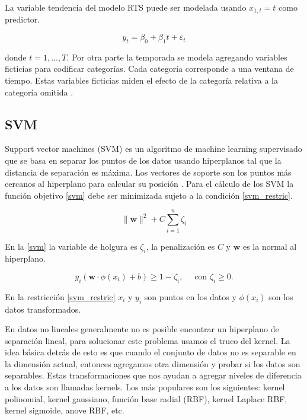 La variable tendencia del modelo RTS puede ser modelada usando $x_{1, t}=t$ como predictor.

\[
y_{t}=\beta_{0}+\beta_{1} t+\varepsilon_{t}
\]

donde $t=1,...,T$. Por otra parte la temporada se modela agregando variables ficticias para codificar categorías. Cada categoría corresponde a una ventana de tiempo. Estas variables ficticias miden el efecto de la categoría relativa a la categoría omitida \cite{hyndmanForecastingPrinciplesPractice}. 

\subsection{SVM}

Support vector machines (SVM) es un algoritmo de machine learning supervisado que se basa en separar los puntos de los datos usando hiperplanos tal que la distancia de separación es máxima. Los vectores de soporte son los puntos más cercanos al hiperplano para calcular su posición \cite{mudassirTimeseriesForecastingBitcoin2020}.
Para el cálculo de los SVM la función objetivo \ref{svm} debe ser minimizada sujeto a la condición \ref{svm_restric}.

\begin{equation}
	\|\mathbf{w}\|^{2}+C \sum_{i=1}^{n} \zeta_{i}
	\label{svm}
\end{equation}

En la \autoref{svm} la variable de holgura es $\zeta_{i}$, la penalización es $C$ y $\mathbf{w}$ es la normal al hiperplano.

\begin{equation}
	y_{i}\left(\mathbf{w} \cdot \phi\left(x_{i}\right)+b \right) \geq 1-\zeta_{i}, \quad \text { con } \zeta_{i} \geq 0.
	\label{svm_restric}
\end{equation}

En la restricción \ref{svm_restric} $x_i$ y $y_i$ son puntos en los datos y $\phi(x_i)$ son los datos transformados. 

En datos no lineales generalmente no es posible encontrar un hiperplano de separación lineal, para solucionar este problema usamos el truco del kernel. La idea básica detrás de esto es que cuando el conjunto de datos no es separable en la dimensión actual, entonces agregamos otra dimensión y probar si los datos son separables.
Estas transformaciones que nos ayudan a agregar niveles de diferencia a los datos son llamadas kernels. Los más populares son los siguientes: kernel polinomial, kernel gaussiano, función base radial (RBF), kernel Laplace RBF, kernel sigmoide, anove RBF, etc.  

